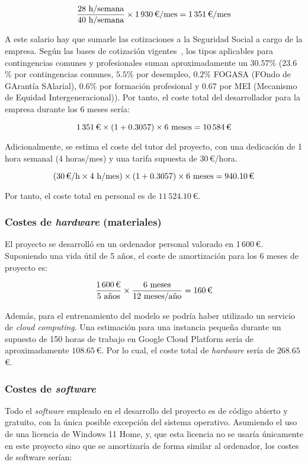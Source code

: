 \[\frac{28 \text{ h/semana}}{40 \text{ h/semana}} \times 1\,930 \text{\,€/mes} = 1\,351 \text{\,€/mes}\]

A este salario hay que sumarle las cotizaciones a la Seguridad Social a cargo de la empresa. Según las bases de cotización vigentes~\cite{segSocial2025}, los tipos aplicables para contingencias comunes y profesionales suman aproximadamente un $30.57$\% ($23.6$\% por contingencias comunes, $5.5$\% por desempleo, $0.2$\% FOGASA (FOndo de GArantía SAlarial),  $0.6$\% por formación profesional y $0.67$ por MEI (Mecanismo de Equidad Intergeneracional)). Por tanto, el coste total del desarrollador para la empresa durante los 6 meses sería:

\[1\,351 \text{\,€} \times (1 + 0.3057) \times 6 \text{ meses} = 10\,584 \text{\,€}\]

Adicionalmente, se estima el coste del tutor del proyecto, con una dedicación de 1 hora semanal (4 horas/mes) y una tarifa supuesta de 30\,€/hora.

\[(30 \text{\,€/h} \times 4 \text{ h/mes}) \times (1 + 0.3057) \times 6 \text{ meses} = 940.10 \text{\,€}\]

Por tanto, el coste total en personal es de $11\,524.10$\,€.

\subsubsection{Costes de \textit{hardware} (materiales)}

El proyecto se desarrolló en un ordenador personal valorado en 1\,600\,€. Suponiendo una vida útil de 5 años, el coste de amortización para los 6 meses de proyecto es:

\[\frac{1\,600 \text{\,€}}{5 \text{ años}} \times \frac{6 \text{ meses}}{12 \text{ meses/año}} = 160 \text{\,€}\]

Además, para el entrenamiento del modelo se podría haber utilizado un servicio de \textit{cloud computing}. Una estimación para una instancia pequeña durante un supuesto de 150 horas de trabajo en Google Cloud Platform sería de aproximadamente $108.65$\,€. Por lo cual, el coste total de \textit{hardware} sería de $268.65$\,€.

\subsubsection{Costes de \textit{software}}

Todo el \textit{software} empleado en el desarrollo del proyecto es de código abierto y gratuito, con la única posible excepción del sistema operativo. Asumiendo el uso de una licencia de Windows 11 Home, y, que esta licencia no se usaría únicamente en este proyecto sino que se amortizaría de forma similar al ordenador, los costes de software serían:

